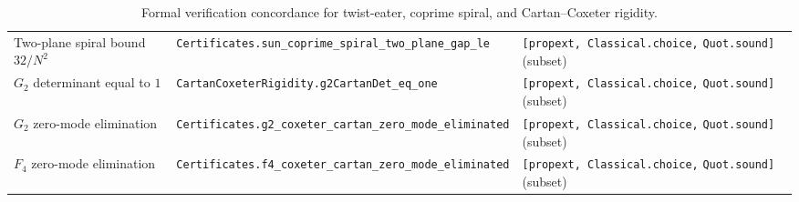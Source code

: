 \documentclass[11pt,a4paper]{article}
\begin{document}
\begin{table}[ht]
\begin{tabular}{@{}p{4.3cm}p{6.6cm}p{3.4cm}@{}}
Two-plane spiral bound $32/N^2$ & \texttt{Certificates.}\newline\texttt{sun\_coprime\_spiral\_two\_plane\_gap\_le} & \texttt{[propext, Classical.choice,} \texttt{Quot.sound]} (subset) \\
$G_2$ determinant equal to $1$ & \texttt{CartanCoxeterRigidity.}\newline\texttt{g2CartanDet\_eq\_one} & \texttt{[propext, Classical.choice,} \texttt{Quot.sound]} (subset) \\
$G_2$ zero-mode elimination & \texttt{Certificates.}\newline\texttt{g2\_coxeter\_cartan\_zero\_mode\_eliminated} & \texttt{[propext, Classical.choice,} \texttt{Quot.sound]} (subset) \\
$F_4$ zero-mode elimination & \texttt{Certificates.}\newline\texttt{f4\_coxeter\_cartan\_zero\_mode\_eliminated} & \texttt{[propext, Classical.choice,} \texttt{Quot.sound]} (subset) \\
\bottomrule
\end{tabular}
\caption{Formal verification concordance for twist-eater, coprime spiral, and Cartan--Coxeter rigidity.}
\label{tab:paper3-concordance}
\end{table}



\end{document}
